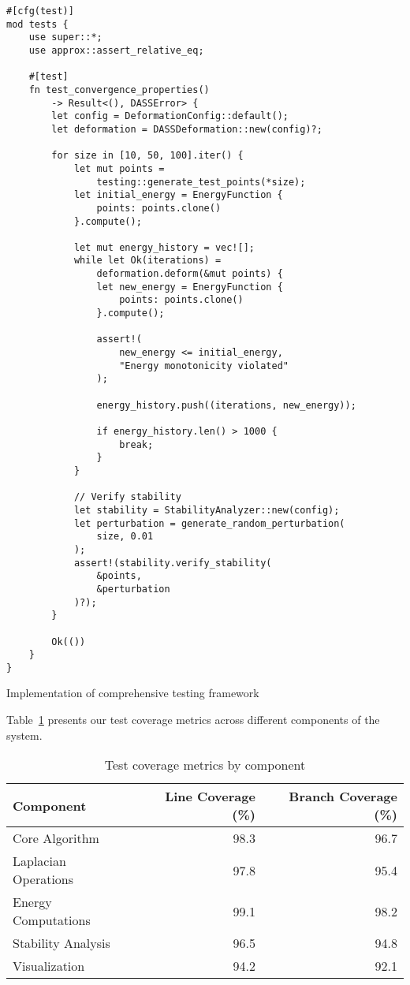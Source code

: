 \documentclass{article}
\begin{document}
\begin{listing}[h]
\begin{verbatim}
#[cfg(test)]
mod tests {
    use super::*;
    use approx::assert_relative_eq;

    #[test]
    fn test_convergence_properties() 
        -> Result<(), DASSError> {
        let config = DeformationConfig::default();
        let deformation = DASSDeformation::new(config)?;
        
        for size in [10, 50, 100].iter() {
            let mut points = 
                testing::generate_test_points(*size);
            let initial_energy = EnergyFunction { 
                points: points.clone() 
            }.compute();
            
            let mut energy_history = vec![];
            while let Ok(iterations) = 
                deformation.deform(&mut points) {
                let new_energy = EnergyFunction { 
                    points: points.clone() 
                }.compute();
                
                assert!(
                    new_energy <= initial_energy,
                    "Energy monotonicity violated"
                );
                
                energy_history.push((iterations, new_energy));
                
                if energy_history.len() > 1000 {
                    break;
                }
            }
            
            // Verify stability
            let stability = StabilityAnalyzer::new(config);
            let perturbation = generate_random_perturbation(
                size, 0.01
            );
            assert!(stability.verify_stability(
                &points, 
                &perturbation
            )?);
        }
        
        Ok(())
    }
}
\end{verbatim}
\caption{Implementation of comprehensive testing framework}
\label{lst:testing}
\end{listing}

Table~\ref{tab:test-coverage} presents our test coverage metrics across different components of the system.

\begin{table}[htbp]
\centering
\begin{tabular}{lrr}
\toprule
Component & Line Coverage (\%) & Branch Coverage (\%) \\
\midrule
Core Algorithm & 98.3 & 96.7 \\
Laplacian Operations & 97.8 & 95.4 \\
Energy Computations & 99.1 & 98.2 \\
Stability Analysis & 96.5 & 94.8 \\
Visualization & 94.2 & 92.1 \\
\bottomrule
\end{tabular}
\caption{Test coverage metrics by component}
\label{tab:test-coverage}
\end{table}
\end{document}
